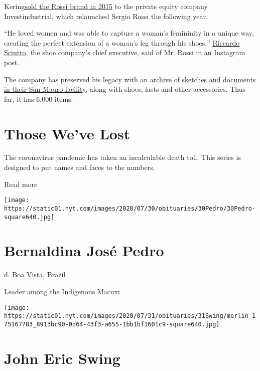 Kering\href{https://www.nytimes.com/2015/12/10/business/dealbook/kering-sergio-rossi-investindustrial.html}{sold
the Rossi brand in 2015} to the private equity company Investindustrial,
which relaunched Sergio Rossi the following year.

``He loved women and was able to capture a woman's femininity in a
unique way, creating the perfect extension of a woman's leg through his
shoes,'' \href{https://www.instagram.com/p/B-hPwEKo0ug/}{Riccardo
Sciutto}, the shoe company's chief executive, said of Mr. Rossi in an
Instagram post.

The company has preserved his legacy with an
\href{https://aeworld.com/fashion/sergio-rossi-launches-a-new-project-that-celebrates-its-heritage/}{archive
of sketches and documents in their San Mauro facility}, along with
shoes, lasts and other accessories. Thus far, it has 6,000 items.

\href{https://www.nytimes.com/interactive/2020/obituaries/people-died-coronavirus-obituaries.html?action=click\&pgtype=Article\&state=default\&region=BELOW_MAIN_CONTENT\&context=covid_obits_promo}{}

\hypertarget{those-weve-lost}{%
\section{Those We've Lost}\label{those-weve-lost}}

The coronavirus pandemic has taken an incalculable death toll. This
series is designed to put names and faces to the numbers.

Read more

\texttt{[image: https://static01.nyt.com/images/2020/07/30/obituaries/30Pedro/30Pedro-square640.jpg]}

\hypertarget{bernaldina-josuxe9-pedro}{%
\section{Bernaldina José Pedro}\label{bernaldina-josuxe9-pedro}}

d. Boa Vista, Brazil

Leader among the Indigenous Macuxi

\texttt{[image: https://static01.nyt.com/images/2020/07/31/obituaries/31Swing/merlin\_175167783\_8913bc90-0d64-43f3-a655-1bb1bf1601c9-square640.jpg]}

\hypertarget{john-eric-swing}{%
\section{John Eric Swing}\label{john-eric-swing}}

